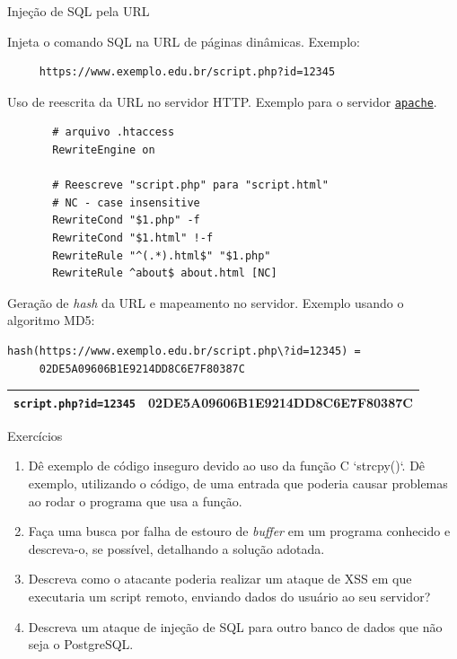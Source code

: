 \begin{frame}[fragile]{Injeção de SQL pela URL}\footnotesize

  Injeta o comando SQL na URL de páginas dinâmicas. Exemplo:

   \begin{verbatim}
     https://www.exemplo.edu.br/script.php?id=12345
   \end{verbatim}

   \pause

     Uso de reescrita da URL no servidor HTTP. Exemplo para o servidor 
     \href{https://apache.org/}{\tt apache}.

     {\scriptsize
     \begin{verbatim}
       # arquivo .htaccess
       RewriteEngine on

       # Reescreve "script.php" para "script.html"
       # NC - case insensitive
       RewriteCond "$1.php" -f
       RewriteCond "$1.html" !-f
       RewriteRule "^(.*).html$" "$1.php"
       RewriteRule ^about$ about.html [NC]
     \end{verbatim}
     }

     \pause
    Geração de {\it hash\/} da URL e mapeamento no servidor.
    Exemplo usando o algoritmo {MD5}:

{\scriptsize
\begin{verbatim}
hash(https://www.exemplo.edu.br/script.php\?id=12345) = 
     02DE5A09606B1E9214DD8C6E7F80387C
\end{verbatim}

\begin{tabular}{l|l}\hline
{\tt script.php?id=12345} & 02DE5A09606B1E9214DD8C6E7F80387C \\\hline
\end{tabular}
}
\end{frame}

\begin{frame}{Exercícios}

  \begin{enumerate}
    \item Dê exemplo de código inseguro devido ao uso da função C `strcpy()`.
    Dê exemplo, utilizando o código, de uma entrada que poderia causar
    problemas ao rodar o programa que usa a função.

  \item Faça uma busca por falha de estouro de {\it buffer\/} em um programa conhecido
  e descreva-o, se possível, detalhando a solução adotada.

\item Descreva como o atacante poderia realizar um ataque de XSS em que
  executaria um script remoto, enviando dados do usuário ao seu
  servidor?

\item Descreva um ataque de injeção de SQL para outro banco de dados
  que não seja o PostgreSQL.
\end{enumerate}

\end{frame}

